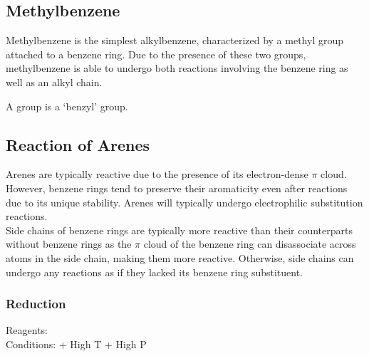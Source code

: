 \documentclass[../main]{subfiles}
\begin{document}
	\begin{center}
	\end{center}

	\subsection{Methylbenzene}

	Methylbenzene is the simplest alkylbenzene, characterized by a methyl group attached to a benzene ring. Due to the presence of these two groups, methylbenzene is able to undergo both reactions involving the benzene ring as well as an alkyl chain. \\

	\begin{center}
	\end{center}

	A  group is a `benzyl' group. \\

	\begin{center}
	\end{center}

	\subsection{Reaction of Arenes}

	Arenes are typically reactive due to the presence of its electron-dense \(\pi\)  cloud. However, benzene rings tend to preserve their aromaticity even after reactions due to its unique stability. Arenes will typically undergo electrophilic substitution reactions. \\

	Side chains of benzene rings are typically more reactive than their counterparts without benzene rings as the \(\pi\)  cloud of the benzene ring can disassociate across  atoms in the side chain, making them more reactive. Otherwise, side chains can undergo any reactions as if they lacked its benzene ring substituent.

	\subsubsection{Reduction}

	Reagents: \\
	Conditions:  + High T + High P 
\end{document}
